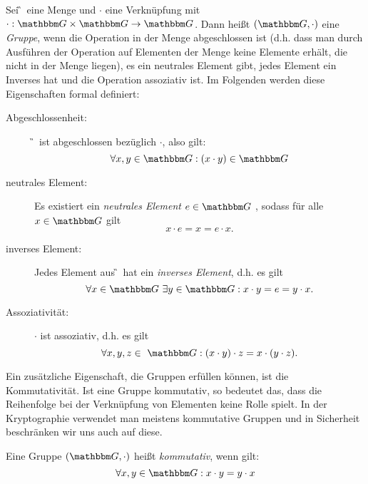 \begin{definition}[Gruppe]
Sei \G~eine Menge und $\cdot$ eine Verknüpfung mit $\cdot: \G\times \G \to
\G$. Dann heißt $(\G, \cdot)$ eine \textit{Gruppe}, wenn die Operation
in der Menge abgeschlossen ist (d.h. dass man durch Ausführen der
Operation auf Elementen der Menge keine Elemente erhält, die nicht in der
Menge liegen), es ein neutrales Element gibt, jedes 
Element ein Inverses hat und die Operation assoziativ ist. Im Folgenden
werden diese Eigenschaften formal definiert: 
\begin{description}
\item[Abgeschlossenheit:]
 \G~ist abgeschlossen bezüglich $\cdot$, also gilt:
  \[\forall x, y \in \G: (x\cdot y)\in \G\]
\item[neutrales Element:]
 Es existiert ein \textit{neutrales Element}  $e \in \G$ , sodass für
  alle $x \in \G$ gilt \[x\cdot e=x=e\cdot x.\]
\item[inverses Element:] Jedes Element aus \G~hat ein \textit{inverses Element}, d.h. es gilt \[\forall x \in
  \G~ \exists y \in \G: x\cdot y=e=y\cdot x.\]

\item[Assoziativität:] $\cdot$ ist assoziativ, d.h. es gilt \[\forall x, y, z  \in ~\G:
  (x\cdot y)\cdot z = x\cdot(y \cdot z).\]
\end{description}
\end{definition}

Ein zusätzliche Eigenschaft, die Gruppen erfüllen können, ist die
Kommutativität. Ist eine Gruppe kommutativ, so bedeutet das, dass die
Reihenfolge bei der Verknüpfung von Elementen keine Rolle spielt. In der
Kryptographie verwendet man meistens kommutative Gruppen und in
\glqq Sicherheit\grqq{} beschränken wir uns auch auf diese. 
\begin{definition}
  Eine Gruppe $(\G, \cdot)$ heißt \textit{kommutativ}, wenn gilt:
\[
  \forall x, y \in \G: x \cdot y = y \cdot x
\]
\end{definition}


